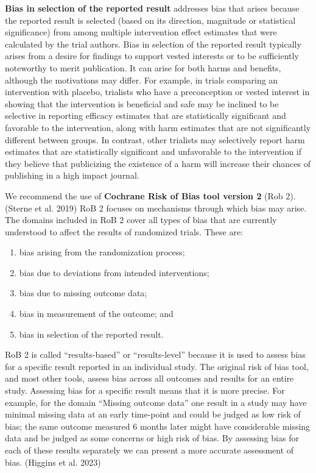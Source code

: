 \documentclass[
  10pt,
  a4paper,
  DIV=11,
  numbers=noendperiod]{scrreprt}
\begin{document}
\textbf{Bias in selection of the reported result} addresses bias that
arises because the reported result is selected (based on its direction,
magnitude or statistical significance) from among multiple intervention
effect estimates that were calculated by the trial authors. Bias in
selection of the reported result typically arises from a desire for
findings to support vested interests or to be sufficiently noteworthy to
merit publication. It can arise for both harms and benefits, although
the motivations may differ. For example, in trials comparing an
intervention with placebo, trialists who have a preconception or vested
interest in showing that the intervention is beneficial and safe may be
inclined to be selective in reporting efficacy estimates that are
statistically significant and favorable to the intervention, along with
harm estimates that are not significantly different between groups. In
contrast, other trialists may selectively report harm estimates that are
statistically significant and unfavorable to the intervention if they
believe that publicizing the existence of a harm will increase their
chances of publishing in a high impact journal.

We recommend the use of \textbf{Cochrane Risk of Bias tool version 2}
(Rob 2). (Sterne et al. 2019) RoB 2 focuses on mechanisms through which
bias may arise. The domains included in RoB 2 cover all types of bias
that are currently understood to affect the results of randomized
trials. These are:

\begin{enumerate}
\def\labelenumi{\arabic{enumi}.}
\item
  bias arising from the randomization process;
\item
  bias due to deviations from intended interventions;
\item
  bias due to missing outcome data;
\item
  bias in measurement of the outcome; and
\item
  bias in selection of the reported result.
\end{enumerate}

RoB 2 is called ``results-based'' or ``results-level'' because it is
used to assess bias for a specific result reported in an individual
study. The original risk of bias tool, and most other tools, assess bias
across all outcomes and results for an entire study. Assessing bias for
a specific result means that it is more precise. For example, for the
domain ``Missing outcome data'' one result in a study may have minimal
missing data at an early time-point and could be judged as low risk of
bias; the same outcome measured 6 months later might have considerable
missing data and be judged as some concerns or high risk of bias. By
assessing bias for each of these results separately we can present a
more accurate assessment of bias. (Higgins et al. 2023)
\end{document}

